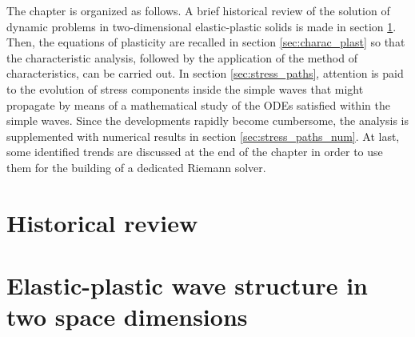 The chapter is organized as follows.
A brief historical review of the solution of dynamic problems in two-dimensional elastic-plastic solids is made in section \ref{sec:review}.
Then, the equations of plasticity are recalled in section \ref{sec:charac_plast} so that the characteristic analysis, followed by the application of the method of characteristics, can be carried out.
In section \ref{sec:stress_paths}, attention is paid to the evolution of stress components inside the simple waves that might propagate by means of a mathematical study of the ODEs satisfied within the simple waves.
Since the developments rapidly become cumbersome, the analysis is supplemented with numerical results in section \ref{sec:stress_paths_num}.
At last, some identified trends are discussed at the end of the chapter in order to use them for the building of a dedicated Riemann solver. 

\section{Historical review}
\label{sec:review}










\section{Elastic-plastic wave structure in two space dimensions}
